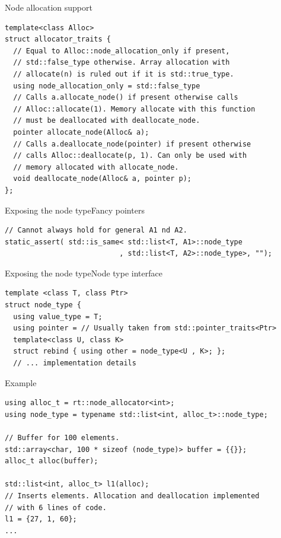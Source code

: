 \documentclass[10pt,aspectratio=169]{beamer}
\begin{document}
\begin{frame}[fragile]{Node allocation support}

\begin{lstlisting}
template<class Alloc>
struct allocator_traits {
  // Equal to Alloc::node_allocation_only if present,
  // std::false_type otherwise. Array allocation with
  // allocate(n) is ruled out if it is std::true_type.
  using node_allocation_only = std::false_type
  // Calls a.allocate_node() if present otherwise calls
  // Alloc::allocate(1). Memory allocate with this function
  // must be deallocated with deallocate_node.
  pointer allocate_node(Alloc& a);
  // Calls a.deallocate_node(pointer) if present otherwise
  // calls Alloc::deallocate(p, 1). Can only be used with
  // memory allocated with allocate_node.
  void deallocate_node(Alloc& a, pointer p);
};
\end{lstlisting}

\end{frame}

\begin{frame}[fragile]{Exposing the node type}{Fancy pointers}

\begin{lstlisting}
// Cannot always hold for general A1 nd A2.
static_assert( std::is_same< std::list<T, A1>::node_type
                           , std::list<T, A2>::node_type>, "");
\end{lstlisting}

\end{frame}

\begin{frame}[fragile]{Exposing the node type}{Node type interface}

\begin{lstlisting}
template <class T, class Ptr>
struct node_type {
  using value_type = T;
  using pointer = // Usually taken from std::pointer_traits<Ptr>
  template<class U, class K>
  struct rebind { using other = node_type<U , K>; };
  // ... implementation details
\end{lstlisting}

\end{frame}

\begin{frame}[fragile]{Example}

\begin{lstlisting}
using alloc_t = rt::node_allocator<int>;
using node_type = typename std::list<int, alloc_t>::node_type;

// Buffer for 100 elements.
std::array<char, 100 * sizeof (node_type)> buffer = {{}};
alloc_t alloc(buffer);

std::list<int, alloc_t> l1(alloc);
// Inserts elements. Allocation and deallocation implemented
// with 6 lines of code.
l1 = {27, 1, 60};
...
\end{lstlisting}

\end{frame}
\end{document}
